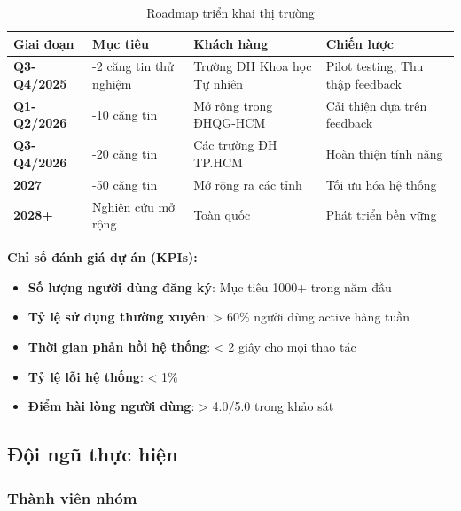 \documentclass[12pt,a4paper]{article}
\begin{document}
\begin{table}[H]
\centering
\caption{Roadmap triển khai thị trường}
\label{tab:go-to-market}
\begin{tabular}{@{}>{\raggedright\arraybackslash}p{2cm}>{\raggedright\arraybackslash}p{4cm}>{\raggedright\arraybackslash}p{3cm}>{\raggedright\arraybackslash}p{4cm}@{}}
\toprule
\textbf{Giai đoạn} & \textbf{Mục tiêu} & \textbf{Khách hàng} & \textbf{Chiến lược} \\
\midrule
\textbf{Q3-Q4/2025} & 1-2 căng tin thử nghiệm & Trường ĐH Khoa học Tự nhiên & Pilot testing, Thu thập feedback \\
\textbf{Q1-Q2/2026} & 5-10 căng tin & Mở rộng trong ĐHQG-HCM & Cải thiện dựa trên feedback \\
\textbf{Q3-Q4/2026} & 15-20 căng tin & Các trường ĐH TP.HCM & Hoàn thiện tính năng \\
\textbf{2027} & 30-50 căng tin & Mở rộng ra các tỉnh & Tối ưu hóa hệ thống \\
\textbf{2028+} & Nghiên cứu mở rộng & Toàn quốc & Phát triển bền vững \\
\bottomrule
\end{tabular}
\end{table}

\textbf{Chỉ số đánh giá dự án (KPIs):}
\begin{itemize}[leftmargin=1cm]
    \item \textbf{Số lượng người dùng đăng ký}: Mục tiêu 1000+ trong năm đầu
    \item \textbf{Tỷ lệ sử dụng thường xuyên}: > 60\% người dùng active hàng tuần
    \item \textbf{Thời gian phản hồi hệ thống}: < 2 giây cho mọi thao tác
    \item \textbf{Tỷ lệ lỗi hệ thống}: < 1\%
    \item \textbf{Điểm hài lòng người dùng}: > 4.0/5.0 trong khảo sát
\end{itemize}

\subsection{Đội ngũ thực hiện}

\subsubsection{Thành viên nhóm}
\end{document}
